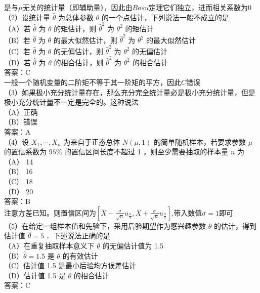 \documentclass[UTF8,openany]{book}
\begin{document}
	是与$\mu$无关的统计量（即辅助量），因此由$Basu$定理它们独立，进而相关系数为$0$\\
	（2）设统计量 $\hat{\theta}$ 为总体参数 $\theta$ 的一个点估计，下列说法一般不成立的是\underline{\hspace{1cm}}\\
	（A）若 $\hat{\theta}$ 为 $\theta$ 的矩估计，则 $\hat{\theta}^{2}$ 为 $\theta^{2}$ 的矩估计\\
	（B）若 $\hat{\theta}$ 为 $\theta$ 的最大似然估计，则 $\hat{\theta}^{2}$ 为 $\theta^{2}$ 的最大似然估计\\
	（C）若 $\hat{\theta}$ 为 $\theta$ 的无偏估计，则 $\hat{\theta}^{2}$ 为 $\theta^{2}$ 的无偏估计\\
	（D）若 $\hat{\theta}$ 为 $\theta$ 的相合估计，则 $\hat{\theta}^{2}$ 为 $\theta^{2}$ 的相合估计\\
	答案：C\\
	一般一个随机变量的二阶矩不等于其一阶矩的平方，因此$C$错误\\
	（3）如果极小充分统计量存在，那么充分完全统计量必是极小充分统计量，但是极小充分统计量不一定是完全的。这种说法\underline{\hspace{1cm}}\\
	（A）正确\\
	（B）错误\\
	答案：A\\
	（4）设 $X_{1}, \cdots, X_{n}$ 为来自于正态总体 $N(\mu, 1)$ 的简单随机样本，若要求参数 $\mu$ 的置信系数为 $95 \%$ 的置信区间长度不超过 1 ，则至少需要抽取的样本量 $n$ 为 \underline{\hspace{1cm}}\\
	（A） 14\\
	（B） 16\\
	（C） 18\\
	（D） 20\\
	答案：B\\
	注意方差已知。则置信区间为$\left[\overline{X}-\frac{\sigma}{\sqrt{n}} u_{\frac{\alpha}{2}}, \overline{X}+\frac{\sigma}{\sqrt{n}} u_{\frac{\alpha}{2}}\right]$,带入数值$\sigma=1$即可\\
	（5）在给定一组样本值和先验下，采用后验期望作为感兴趣参数 $\theta$ 的估计，得到估计值 $\hat{\theta}=5$ ．下述说法正确的是\underline{\hspace{1cm}}\\
	（A）在重复抽取样本意义下 $\theta$ 的无偏估计值为 1.5\\
	（B）$\hat{\theta}=1.5$ 是 $\theta$ 的有效估计\\
	（C）估计值 1.5 是最小后验均方误差估计\\
	（D）估计值 1.5 是 $\theta$ 的相合估计\\
	答案：C\\
	
\end{document}
